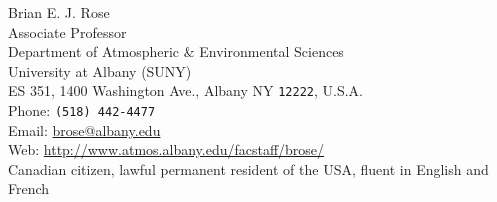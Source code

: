 \documentclass[11pt, letterpaper]{article} %
\begin{document}
\thispagestyle{empty}


{\LARGE Brian E. J. Rose}\\[0.3 cm] %
Associate Professor \\
Department of Atmospheric \& Environmental Sciences \\
University at Albany (SUNY) \\
ES 351, 1400 Washington Ave., Albany NY \texttt{12222}, U.S.A.\\[.2cm]
Phone: \texttt{(518) 442-4477}\\ %
Email: \href{mailto:brose@albany.edu}{brose@albany.edu}\\ %
Web: \href{http://www.atmos.albany.edu/facstaff/brose/}{http://www.atmos.albany.edu/facstaff/brose/}\\ %

Canadian citizen, lawful permanent resident of the USA, fluent in English and French








\end{document}
